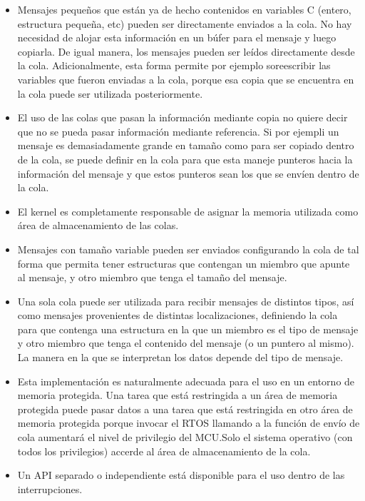 \begin{itemize}
    \item Mensajes pequeños que están ya de hecho contenidos en variables C (entero, estructura pequeña, etc) pueden ser directamente enviados a la cola. No hay necesidad de alojar esta información en un búfer para el mensaje y luego copiarla. De igual manera, los mensajes pueden ser leídos directamente desde la cola. Adicionalmente, esta forma permite por ejemplo soreescribir las variables que fueron enviadas a la cola, porque esa copia que se encuentra en la cola puede ser utilizada posteriormente.
    \item El uso de las colas que pasan la información mediante copia no quiere decir que no se pueda pasar información mediante referencia. Si por ejempli un mensaje es demasiadamente grande en tamaño como para ser copiado dentro de la cola, se puede definir en la cola para que esta maneje punteros hacia la información del mensaje y que estos punteros sean los que se envíen dentro de la cola.
    \item El kernel es completamente responsable de asignar la memoria utilizada como área de almacenamiento de las colas.
    \item Mensajes con tamaño variable pueden ser enviados configurando la cola de tal forma que permita tener estructuras que contengan un miembro que apunte al mensaje, y otro miembro que tenga el tamaño del mensaje.
    \item Una sola cola puede ser utilizada para recibir mensajes de distintos tipos, así como mensajes provenientes de distintas localizaciones, definiendo la cola para que contenga una estructura en la que un miembro es el tipo de mensaje y otro miembro que tenga el contenido del mensaje (o un puntero al mismo). La manera en la que se interpretan los datos depende del tipo de mensaje. 
    \item Esta implementación es naturalmente adecuada para el uso en un entorno de memoria protegida. Una tarea que está restringida a un área de memoria protegida puede pasar datos a una tarea que está restringida en otro área de memoria protegida porque invocar el RTOS llamando a la función de envío de cola aumentará el nivel de privilegio del MCU.Solo el sistema operativo (con todos los privilegios) accerde al área de almacenamiento de la cola.
    \item Un API separado o independiente está disponible para el uso dentro de las interrupciones.
\end{itemize}

